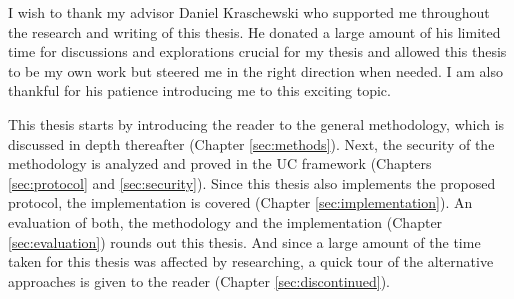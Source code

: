 %
%

I wish to thank my advisor Daniel Kraschewski who supported me throughout the
research and writing of this thesis. He donated a large amount of his limited
time for discussions and explorations crucial for my thesis and allowed this
thesis to be my own work but steered me in the right direction when needed.  I
am also thankful for his patience introducing me to this exciting topic.


%
%

This thesis starts by introducing the reader to the general methodology, which
is discussed in depth thereafter (Chapter \ref{sec:methods}). Next, the security
of the methodology is analyzed and proved in the UC framework (Chapters
\ref{sec:protocol} and \ref{sec:security}). Since this thesis also implements
the proposed protocol, the implementation is covered (Chapter
\ref{sec:implementation}). An evaluation of both, the methodology and the
implementation (Chapter \ref{sec:evaluation}) rounds out this thesis.  And since
a large amount of the time taken for this thesis was affected by researching, a
quick tour of the alternative approaches is given to the reader (Chapter
\ref{sec:discontinued}).

